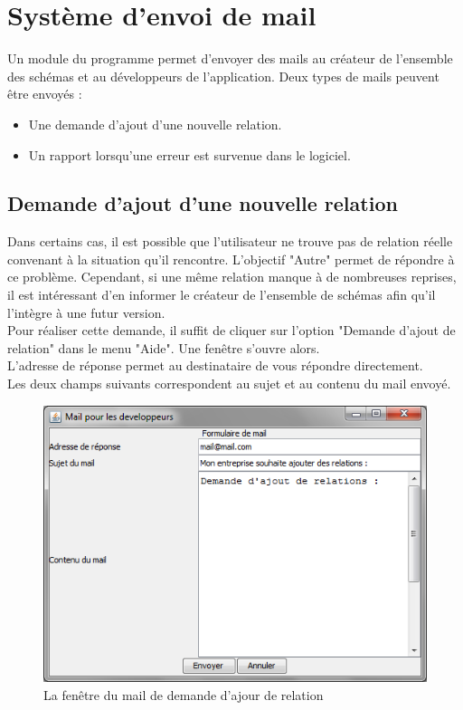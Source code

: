 
\chapter{Système d'envoi de mail}

Un module du programme permet d'envoyer des mails au créateur de l'ensemble des schémas et au développeurs de l'application. Deux types de mails peuvent être envoyés :\\
\begin{itemize}
\item Une demande d'ajout d'une nouvelle relation. 
\item Un rapport lorsqu'une erreur est survenue dans le logiciel. 
\end{itemize}

\section{Demande d'ajout d'une nouvelle relation}

Dans certains cas, il est possible que l'utilisateur ne trouve pas de relation réelle convenant à la situation qu'il rencontre. L'objectif "Autre" permet de répondre à ce problème. Cependant, si une même relation manque à de nombreuses reprises, il est intéressant d'en informer le créateur de l'ensemble de schémas afin qu'il l'intègre à une futur version.\\

Pour réaliser cette demande, il suffit de cliquer sur l'option "Demande d'ajout de relation" dans le menu "Aide". Une fenêtre s'ouvre alors.\\

L'adresse de réponse permet au destinataire de vous répondre directement.\\

Les deux champs suivants correspondent au sujet et au contenu du mail envoyé.\\


\begin{figure}
\centering
\includegraphics[width=12cm]{images/mail_relation.png}
\caption{La fenêtre du mail de demande d'ajour de relation}
\end{figure}
